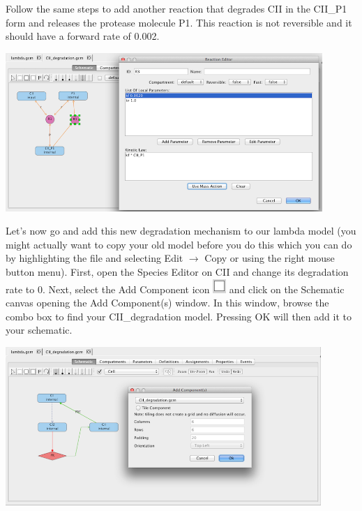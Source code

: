 \documentclass[titlepage,11pt]{article}
\begin{document}
Follow the same steps to add another reaction that degrades CII in the CII\_P1 form and releases the protease molecule P1.  This reaction is not reversible and it should have a forward rate of 0.002.

\begin{center}
\includegraphics[height=60mm]{screenshots/kineticLaw}
\end{center}

Let's now go and add this new degradation mechanism to our lambda model (you might actually want to copy your old model before you do this which you can do by highlighting the file and selecting Edit $\rightarrow$ Copy or using the right mouse button menu).  First, open the Species Editor on CII and change its degradation rate to 0.  Next, select the Add Component icon \includegraphics{../gui/icons/modelview/add_component_selected} and click on the Schematic canvas opening the Add Component(s) window.  In this window, browse the combo box to find your CII\_degradation model.  Pressing OK will then add it to your schematic.

\begin{center}
\includegraphics[height=60mm]{screenshots/addComponent}
\end{center}
\end{document}
